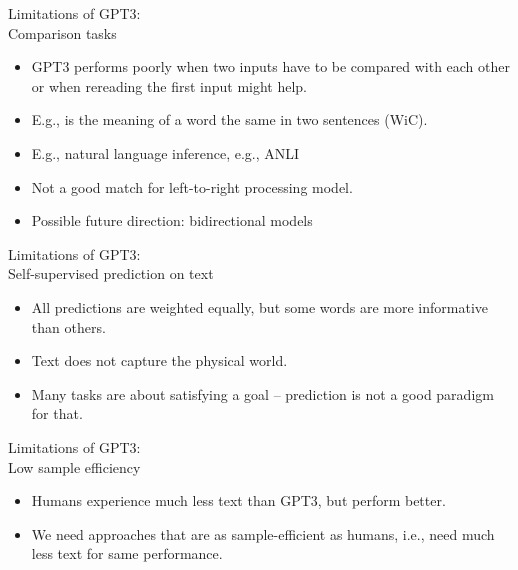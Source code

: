 \begin{vbframe}{Limitations of GPT3:\\ Comparison tasks}

\vfill
			
  \begin{itemize}
\item GPT3 performs poorly when two inputs have to be
compared with each other or when rereading the first input
might help.
\item E.g., is the meaning of a word the same in two
sentences (WiC).
\item E.g., natural language inference, e.g., ANLI
\item Not a good match for left-to-right processing model.
\item Possible future direction: bidirectional models
    \end{itemize}

\vfill

\end{vbframe}


\begin{vbframe}{Limitations of GPT3:\\ Self-supervised prediction on text}

\vfill

  \begin{itemize}
\item All predictions are weighted equally, but some
words are more informative than others.
    \item Text does not capture the physical world.
\item Many tasks are about satisfying a goal --
prediction is not a good paradigm for that.
    \end{itemize}

\vfill

\end{vbframe}


\begin{vbframe}{Limitations of GPT3:\\ Low sample efficiency}

\vfill

  \begin{itemize}
\item Humans experience much less text than GPT3, but
perform better.
    \item We  need approaches that are as
    sample-efficient as humans, i.e., need much less text
    for same performance.

    \end{itemize}

\vfill

\end{vbframe}

